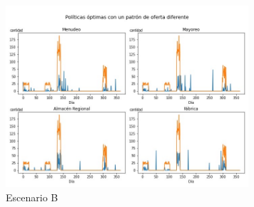 \begin{figure}[H]
\caption{Escenario B}
\label{scen_alternative_supply}
\includegraphics[width=9cm]{tesis_tex/figs/policyiteration_scen_alternativesupply.png}
\centering
\end{figure}